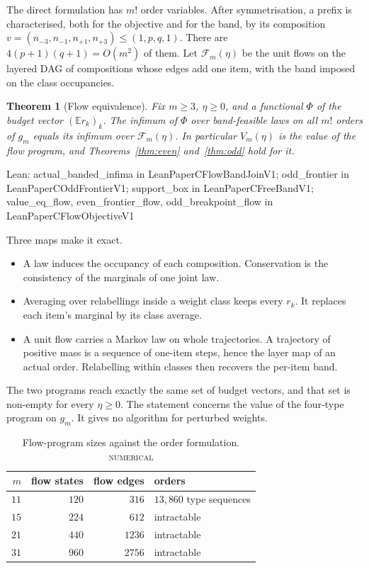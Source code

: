\documentclass[conference]{IEEEtran}
\newtheorem{theorem}{Theorem}
\theoremstyle{definition}
\newcommand{\lean}[1]{\textsf{\footnotesize #1}}
\newcommand{\leanbox}[1]{%
  \par\vspace{2pt}\noindent
  {\raggedright\footnotesize\textsf{Lean: #1}\par}\vspace{2pt}}
\newcommand{\NUM}{\textsc{numerical}}
\begin{document}
The direct formulation has $m!$ order variables. After symmetrisation, a prefix is characterised,
both for the objective and for the band, by its composition
$v=(n_{-3},n_{-1},n_{+1},n_{+3})\le(1,p,q,1)$. There are $4(p+1)(q+1)=O(m^{2})$ of them. Let
$\mathcal{F}_{m}(\eta)$ be the unit flows on the layered DAG of compositions whose edges add
one item, with the band imposed on the class occupancies.

\begin{theorem}[Flow equivalence]
\label{thm:flow}
Fix $m\ge3$, $\eta\ge0$, and a functional $\Phi$ of the budget vector $(\mathbb{E}r_{k})_{k}$. The
infimum of $\Phi$ over band-feasible laws on all $m!$ orders of $g_{m}$ equals its infimum
over $\mathcal{F}_{m}(\eta)$. In particular $V_{m}(\eta)$ is the value of the flow program,
and Theorems~\ref{thm:even} and~\ref{thm:odd} hold for it.
\end{theorem}

\leanbox{\lean{actual\_banded\_infima} in \lean{LeanPaperCFlowBandJoinV1};
\lean{odd\_frontier} in \lean{LeanPaperCOddFrontierV1}; \lean{support\_box} in
\lean{LeanPaperCFreeBandV1}; \lean{value\_eq\_flow}, \lean{even\_frontier\_flow}, \lean{odd\_breakpoint\_flow} in
\lean{LeanPaperCFlowObjectiveV1}}

Three maps make it exact.
\begin{itemize}
\item A law induces the occupancy of each composition. Conservation is the consistency of the
marginals of one joint law.
\item Averaging over relabellings inside a weight class keeps every $r_{k}$. It replaces each
item's marginal by its class average.
\item A unit flow carries a Markov law on whole trajectories. A trajectory of positive mass is
a sequence of one-item steps, hence the layer map of an actual order. Relabelling within
classes then recovers the per-item band.
\end{itemize}
The two programs reach exactly the same set of budget vectors, and that set is non-empty for
every $\eta\ge0$. The statement concerns the value of the four-type program on $g_{m}$. It
gives no algorithm for perturbed weights.

\begin{table}[t]
\caption{Flow-program sizes against the order formulation. \NUM{}}
\label{tab:agree}
\centering
\footnotesize
\begin{tabular}{@{}rrrl@{}}
\toprule
$m$ & flow states & flow edges & orders \\
\midrule
$11$ & $120$ & $316$ & $13{,}860$ type sequences \\
$15$ & $224$ & $612$ & intractable \\
$21$ & $440$ & $1236$ & intractable \\
$31$ & $960$ & $2756$ & intractable \\
\bottomrule
\end{tabular}
\end{table}
\end{document}
